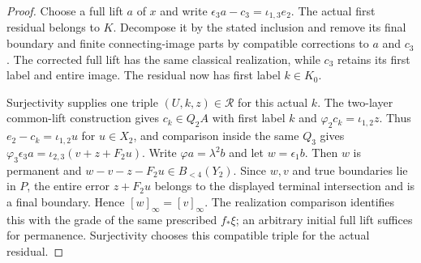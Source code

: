 \begin{proof}
Choose a full lift $a$ of $x$ and write
$\epsilon_3a-c_3=\iota_{1,3}e_2$. The actual first residual belongs
to $K$. Decompose it by the stated inclusion and remove its final
boundary and finite connecting-image parts by compatible corrections
to $a$ and $c_3$. The corrected full lift has the same classical
realization, while $c_3$ retains its first label and entire image.
The residual now has first label $k\in K_0$.

Surjectivity supplies one triple $(U,k,z)\in\mathcal R$ for this
actual $k$. The two-layer common-lift construction gives
$c_k\in Q_2A$ with first label $k$ and
$\varphi_2c_k=\iota_{1,2}z$.
Thus $e_2-c_k=\iota_{1,2}u$ for $u\in X_2$, and comparison
inside the same $Q_3$ gives
$\varphi_3\epsilon_3a=\iota_{2,3}(v+z+F_2u)$.
Write $\varphi a=\lambda^2b$ and let $w=\epsilon_1b$.
Then $w$ is permanent and
$w-v-z-F_2u\in B_{<4}(Y_2)$.
Since $w,v$ and true boundaries lie in $P$, the entire error
$z+F_2u$ belongs to the displayed terminal intersection and is a
final boundary. Hence $[w]_\infty=[v]_\infty$.
The realization comparison identifies this with the grade of the
same prescribed $f_*\xi$; an arbitrary initial full lift suffices
for permanence. Surjectivity chooses this compatible triple for the actual residual.
\end{proof}

